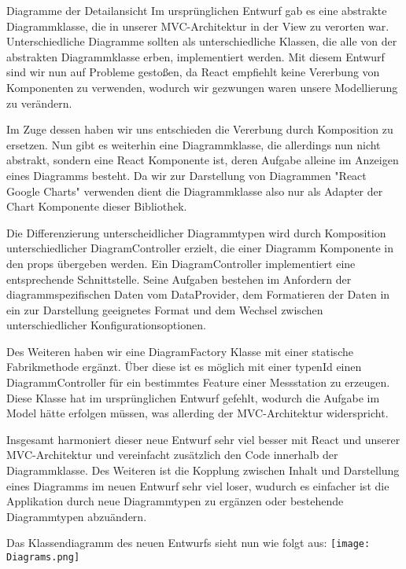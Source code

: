 \begin{Change}{Diagramme der Detailansicht}
    Im ursprünglichen Entwurf gab es eine abstrakte Diagrammklasse, die in unserer MVC-Architektur in der View zu verorten war. Unterschiedliche Diagramme sollten als unterschiedliche Klassen, die alle von der abstrakten Diagrammklasse erben, implementiert werden.
    Mit diesem Entwurf sind wir nun auf Probleme gestoßen, da React empfiehlt keine Vererbung von Komponenten zu verwenden, wodurch wir gezwungen waren unsere Modellierung zu verändern.

    Im Zuge dessen haben wir uns entschieden die Vererbung durch Komposition zu ersetzen. Nun gibt es weiterhin eine Diagrammklasse, die allerdings nun nicht abstrakt, sondern eine React Komponente ist, deren Aufgabe alleine im Anzeigen eines Diagramms besteht. Da wir zur Darstellung von Diagrammen "React Google Charts" verwenden dient die Diagrammklasse also nur als Adapter der Chart Komponente dieser Bibliothek.

    Die Differenzierung unterscheidlicher Diagrammtypen wird durch Komposition unterschiedlicher DiagramController erzielt, die einer Diagramm Komponente in den props übergeben werden. Ein DiagramController implementiert eine entsprechende Schnittstelle. Seine Aufgaben bestehen im Anfordern der diagrammspezifischen Daten vom DataProvider, dem Formatieren der Daten in ein zur Darstellung geeignetes Format und dem Wechsel zwischen unterschiedlicher Konfigurationsoptionen.

    Des Weiteren haben wir eine DiagramFactory Klasse mit einer statische Fabrikmethode ergänzt. Über diese ist es möglich mit einer typenId einen DiagrammController für ein bestimmtes Feature einer Messstation zu erzeugen. Diese Klasse hat im ursprünglichen Entwurf gefehlt, wodurch die Aufgabe im Model hätte erfolgen müssen, was allerding der MVC-Architektur widerspricht.

    Insgesamt harmoniert dieser neue Entwurf sehr viel besser mit React und unserer MVC-Architektur und vereinfacht zusätzlich den Code innerhalb der Diagrammklasse. Des Weiteren ist die Kopplung zwischen Inhalt und Darstellung eines Diagramms im neuen Entwurf sehr viel loser, wudurch es einfacher ist die Applikation durch neue Diagrammtypen zu ergänzen oder bestehende Diagrammtypen abzuändern.
    
    Das Klassendiagramm des neuen Entwurfs sieht nun wie folgt aus:
     \bigskip
    \texttt{[image: Diagrams.png]}\par\vspace{1cm}
    
\end{Change}

